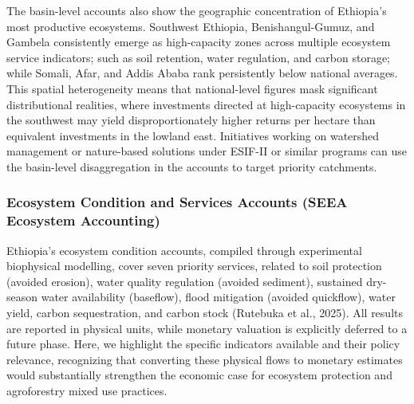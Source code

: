 \documentclass[
  letterpaper,
  DIV=11,
  numbers=noendperiod]{scrartcl}
\begin{document}
The basin-level accounts also show the geographic concentration of
Ethiopia's most productive ecosystems. Southwest Ethiopia,
Benishangul-Gumuz, and Gambela consistently emerge as high-capacity
zones across multiple ecosystem service indicators; such as soil
retention, water regulation, and carbon storage; while Somali, Afar, and
Addis Ababa rank persistently below national averages. This spatial
heterogeneity means that national-level figures mask significant
distributional realities, where investments directed at high-capacity
ecosystems in the southwest may yield disproportionately higher returns
per hectare than equivalent investments in the lowland east. Initiatives
working on watershed management or nature-based solutions under ESIF-II
or similar programs can use the basin-level disaggregation in the
accounts to target priority catchments.

\subsubsection{Ecosystem Condition and Services Accounts (SEEA Ecosystem
Accounting)}\label{ecosystem-condition-and-services-accounts-seea-ecosystem-accounting}

Ethiopia's ecosystem condition accounts, compiled through experimental
biophysical modelling, cover seven priority services, related to soil
protection (avoided erosion), water quality regulation (avoided
sediment), sustained dry-season water availability (baseflow), flood
mitigation (avoided quickflow), water yield, carbon sequestration, and
carbon stock (Rutebuka et al., 2025). All results are reported in
physical units, while monetary valuation is explicitly deferred to a
future phase. Here, we highlight the specific indicators available and
their policy relevance, recognizing that converting these physical flows
to monetary estimates would substantially strengthen the economic case
for ecosystem protection and agroforestry mixed use practices.
\end{document}
